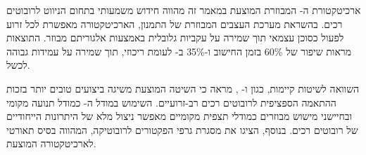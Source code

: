 ארכיטקטורת ה- המבוזרת המוצעת במאמר זה מהווה חידוש משמעותי בתחום הניווט לרובוטים רכים. בהשראת מערכת העצבים המבוזרת של התמנון, הארכיטקטורה מאפשרת לכל זרוע לפעול כסוכן  עצמאי תוך שמירה על עקביות גלובלית באמצעות אלגוריתם  מבוזר. התוצאות מראות שיפור של 60\% בזמן החישוב ו-35\% ב- לעומת  ריכוזי, תוך שמירה על עמידות גבוהה לכשל.

השוואה לשיטות קיימות, כגון  \cite{Cunningham2010} ו- \cite{Choudhary2017}, מראה כי השיטה המוצעת משיגה ביצועים טובים יותר בזכות ההתאמה הספציפית לרובוטים רכים רב-זרועיים. השימוש במודל ה- כמודל תנועה מקומי ובחיישני מישוש מבוזרים כמודלי תצפית מקומיים מאפשר ניצול מלא של היתרונות הייחודיים של רובוטים רכים. בנוסף, \cite{Dellaert2017} הציגו את מסגרת גרפי הפקטורים לרובוטיקה, המהווה בסיס תאורטי לארכיטקטורה המוצעת.

\cite{Thrun2005, Dellaert2017, Cadena2016, Cunningham2010, Choudhary2017, Boyd2011, Sumanaweera2026}

